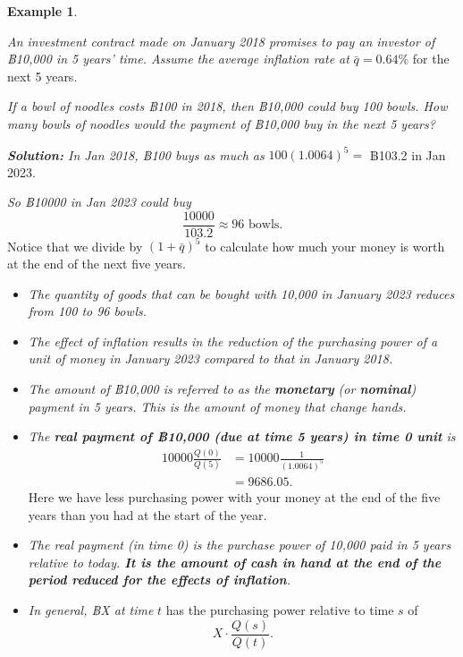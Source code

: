 \documentclass[
]{book}
\theoremstyle{definition}
\theoremstyle{definition}
\newtheorem{example}{Example}[chapter]
\theoremstyle{definition}
\theoremstyle{definition}
\theoremstyle{remark}
\begin{document}
\begin{example}
\protect\hypertarget{exm:unlabeled-div-60}{}\label{exm:unlabeled-div-60}

\emph{An investment contract made on January 2018 promises to pay an investor
of ฿10,000 in 5 years' time. Assume the average inflation rate at}
\(\bar{q} = 0.64\%\) for the next 5 years.

\emph{If a bowl of noodles costs ฿100 in 2018, then ฿10,000 could buy 100
bowls. How many bowls of noodles would the payment of ฿10,000 buy in the
next 5 years?}

\emph{\textbf{Solution:} In Jan 2018, ฿100 buys as much as} \(100 (1.0064)^5 =\)
฿103.2 in Jan 2023.

\emph{So ฿10000 in Jan 2023 could buy}
\[\frac{10000}{103.2} \approx 96 \text{ bowls}.\] Notice that we divide
by \((1 + \bar{q})^5\) to calculate how much your money is worth at the
end of the next five years.

\begin{itemize}
\item
  \emph{The quantity of goods that can be bought with 10,000 in January
  2023 reduces from 100 to 96 bowls.}
\item
  \emph{The effect of inflation results in the reduction of the purchasing
  power of a unit of money in January 2023 compared to that in
  January 2018.}
\item
  \emph{The amount of ฿10,000 is referred to as the \textbf{monetary} (or
  \textbf{nominal}) payment in 5 years. This is the amount of money that
  change hands.}
\item
  \emph{The \textbf{real payment of ฿10,000 (due at time 5 years) in time 0
  unit} is} \[\begin{aligned}
  10000 \frac{Q(0)}{Q(5)} &=  10000  \frac{1}{(1.0064)^5} \\
                           &=  9686.05.\end{aligned}\] Here we have
  less purchasing power with your money at the end of the five years
  than you had at the start of the year.
\item
  \emph{The real payment (in time 0) is the purchase power of 10,000 paid
  in 5 years relative to today. \textbf{It is the amount of cash in hand at
  the end of the period reduced for the effects of inflation}.}
\item
  \emph{In general, ฿X at time} \(t\) has the purchasing power relative to
  time \(s\) of \[X \cdot \frac{Q(s)}{Q(t)}.\]
\end{itemize}

\end{example}
\end{document}
